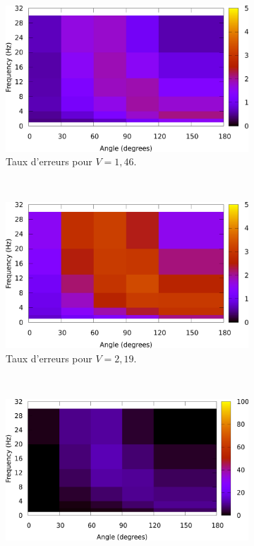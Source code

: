 \begin{figure}[!htb]
		~
		\begin{subfigure}[t]{\subImgWlineplot}
			\centering
			\includegraphics[width=\textwidth]{figures/ch4/average_error_rates_054}
			\caption{Taux d'erreurs pour $V = 1,46$.}
			\label{fig:hmap_e_146}
		\end{subfigure}
		~
		\begin{subfigure}[t]{\subImgWlineplot}
			\centering
			\includegraphics[width=\textwidth]{figures/ch4/average_error_rates_081}
			\caption{Taux d'erreurs pour $V = 2,19$.}
			\label{fig:hmap_e_219}
		\end{subfigure}
		~
		\begin{subfigure}[t]{\subImgWlineplot}
			\centering
			\includegraphics[width=\textwidth]{figures/ch4/average_failure_rates_054}

\end{subfigure}
\end{figure}
